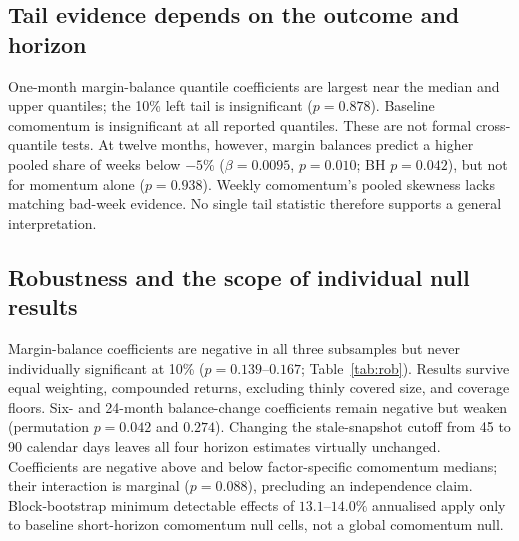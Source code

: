 \documentclass[final,1p,authoryear]{elsarticle}
\begin{document}
\begin{table}[htbp]\centering
\caption{Separating crowding from factor momentum}
\label{tab:orth}

\end{table}


\subsection{Tail evidence depends on the outcome and horizon}

\noindent One-month margin-balance quantile coefficients are largest near the median and upper
quantiles; the 10\% left tail is insignificant ($p=0.878$). Baseline comomentum is insignificant
at all reported quantiles. These are not formal cross-quantile tests. At twelve months, however,
margin balances predict a higher pooled share of weeks below $-5\%$ ($\beta=0.0095$, $p=0.010$;
BH $p=0.042$), but not for momentum alone ($p=0.938$). Weekly comomentum's pooled skewness lacks
matching bad-week evidence. No single tail statistic therefore supports a general interpretation.


\subsection{Robustness and the scope of individual null results}

\noindent Margin-balance coefficients are negative in all three subsamples but never individually
significant at 10\% ($p=0.139$--$0.167$; Table~\ref{tab:rob}). Results survive equal weighting,
compounded returns, excluding thinly covered size, and coverage floors. Six- and 24-month
balance-change coefficients remain negative but weaken (permutation $p=0.042$ and $0.274$).
Changing the stale-snapshot cutoff from 45 to 90 calendar days leaves all four horizon estimates
virtually unchanged. Coefficients are negative above and below factor-specific comomentum medians;
their interaction is marginal ($p=0.088$), precluding an independence claim. Block-bootstrap
minimum detectable effects of $13.1$--$14.0\%$ annualised apply only to baseline short-horizon
comomentum null cells, not a global comomentum null.
\end{document}
